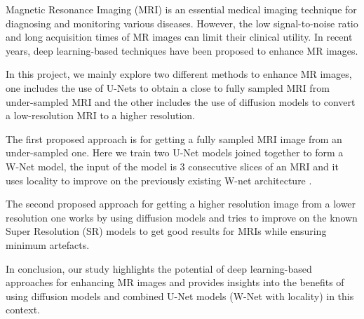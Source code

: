 


\begin{abstracts}        %

Magnetic Resonance Imaging (MRI) is an essential medical imaging technique for diagnosing and monitoring various diseases. However, the low signal-to-noise ratio and long acquisition times of MR images can limit their clinical utility. In recent years, deep learning-based techniques have been proposed to enhance MR images.

In this project, we mainly explore two different methods to enhance MR images, one includes the use of U-Nets to obtain a close to fully sampled MRI from under-sampled MRI and the other includes the use of diffusion models to convert a low-resolution MRI to a higher resolution.

The first proposed approach is for getting a fully sampled MRI image from an under-sampled one. Here we train two U-Net models joined together to form a W-Net model, the input of the model is 3 consecutive slices of an MRI and it uses locality to improve on the previously existing W-net architecture \cite{8919674}.

The second proposed approach for getting a higher resolution image from a lower resolution one works by using diffusion models and tries to improve on the known Super Resolution (SR) models \cite{saharia2021image} to get good results for MRIs while ensuring minimum artefacts.

In conclusion, our study highlights the potential of deep learning-based approaches for enhancing MR images and provides insights into the benefits of using diffusion models and combined U-Net models (W-Net with locality) in this context.

\end{abstracts}




